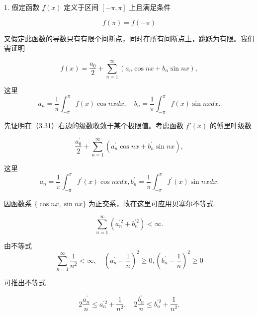 1. 假定函数 $f(x)$ 定义于区间 $[- \pi, \pi]$ 上且满足条件

\begin{equation*}
f (\pi) = f (- \pi)\tag{3.30}
\end{equation*}

又假定此函数的导数只有有限个间断点，同时在所有间断点上，跳跃为有限。我们需证明

\begin{equation*}
f (x) = \frac {a _ {0}}{2} + \sum_ {n = 1} ^ {\infty} \left(a _ {n} \cos n x + b _ {n} \sin n x\right),\tag{3.31}
\end{equation*}

这里
\begin{equation*}
a _ {n} = \frac {1}{\pi} \int_ {- \pi} ^ {\pi} f (x) \cos n x d x, \quad b _ {n} = \frac {1}{\pi} \int_ {- \pi} ^ {\pi} f (x) \sin n x d x.\tag{3.32}
\end{equation*}

先证明在（3.31）右边的级数收敛于某个极限值。考虑函数 $f'(x)$ 的傅里叶级数

\begin{equation*}
\frac {a _ {0} ^ {\prime}}{2} + \sum_ {n = 1} ^ {\infty} \left(a _ {n} ^ {\prime} \cos n x + b _ {n} ^ {\prime} \sin n x\right),\tag{3.33}
\end{equation*}

这里
\begin{equation*}
a _ {n} ^ {\prime} = \frac {1}{\pi} \int_ {- \pi} ^ {\pi} f ^ {\prime} (x) \cos n x d x, b _ {n} ^ {\prime} = \frac {1}{\pi} \int_ {- \pi} ^ {\pi} f ^ {\prime} (x) \sin n x d x.\tag{3.34}
\end{equation*}

因函数系 $\{\cos nx, \sin nx\}$ 为正交系，故在这里可应用贝塞尔不等式

\begin{equation*}
\sum_ {n = 1} ^ {\infty} \left(a _ {n} ^ {\prime 2} + b _ {n} ^ {\prime 2}\right) <   \infty .\tag{3.35}
\end{equation*}

由不等式
\begin{equation*}
\sum_ {n = 1} ^ {\infty} \frac {1}{n ^ {2}} <   \infty , \quad \left(a _ {n} ^ {\prime} - \frac {1}{n}\right) ^ {2} \geqslant 0, \left(b _ {n} ^ {\prime} - \frac {1}{n}\right) ^ {2} \geqslant 0
\end{equation*}

可推出不等式

\begin{equation*}
2 \frac {a _ {n} ^ {\prime}}{n} \leqslant a _ {n} ^ {\prime 2} + \frac {1}{n ^ {2}}, \quad 2 \frac {b _ {n} ^ {\prime}}{n} \leqslant b _ {n} ^ {\prime 2} + \frac {1}{n ^ {2}}.\tag{3.36}
\end{equation*}

